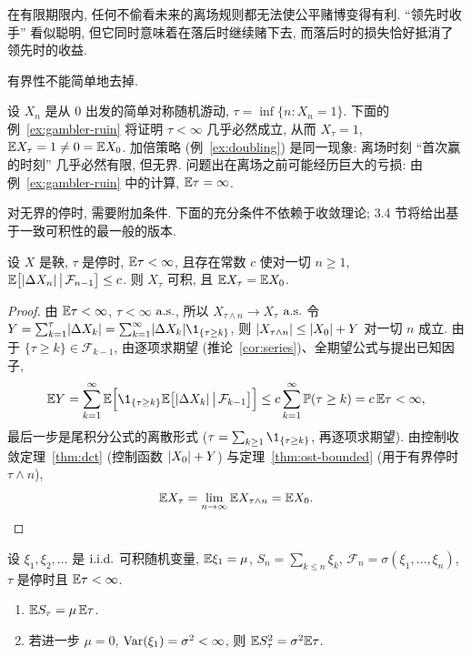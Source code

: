 \begin{intuition}
在有限期限内, 任何不偷看未来的离场规则都无法使公平赌博变得有利. ``领先时收手'' 看似聪明, 但它同时意味着在落后时继续赌下去, 而落后时的损失恰好抵消了领先时的收益.
\end{intuition}

有界性不能简单地去掉.

\begin{example}\label{ex:ost-fails}
设 $X_n$ 是从 $0$ 出发的简单对称随机游动, $\tau=\inf\{n: X_n=1\}$. 下面的例~\ref{ex:gambler-ruin} 将证明 $\tau<\infty$ 几乎必然成立, 从而 $X_\tau=1$, $\mathbb{E} X_\tau=1\ne0=\mathbb{E} X_0$. 加倍策略 (例~\ref{ex:doubling}) 是同一现象: 离场时刻 ``首次赢的时刻'' 几乎必然有限, 但无界. 问题出在离场之前可能经历巨大的亏损: 由例~\ref{ex:gambler-ruin} 中的计算, $\mathbb{E}\tau=\infty$.
\end{example}

对无界的停时, 需要附加条件. 下面的充分条件不依赖于收敛理论; 3.4 节将给出基于一致可积性的最一般的版本.

\begin{theorem}\label{thm:ost-bounded-increments}
设 $X$ 是鞅, $\tau$ 是停时, $\mathbb{E}\tau<\infty$, 且存在常数 $c$ 使对一切 $n\ge1$,
$\mathbb{E}\big[\lvert\Delta X_n\rvert\,\big|\,\mathcal{F}_{n-1}\big]\le c$. 则 $X_\tau$ 可积, 且 $\mathbb{E} X_\tau=\mathbb{E} X_0$.
\end{theorem}

\begin{proof}
由 $\mathbb{E}\tau<\infty$, $\tau<\infty$ $\text{a.s.}$, 所以 $X_{\tau\wedge n}\to X_\tau$ $\text{a.s.}$ 令 $Y=\sum_{k=1}^\tau\abs{\Delta X_k}=\sum_{k=1}^\infty\abs{\Delta X_k}\1_{\{\tau\ge k\}}$, 则 $\lvert X_{\tau\wedge n}\rvert\le\lvert X_0\rvert+Y$ 对一切 $n$ 成立. 由于 $\{\tau\ge k\}\in\mathcal{F}_{k-1}$, 由逐项求期望 (推论~\ref{cor:series})、全期望公式与提出已知因子,
\[
\E Y=\sum_{k=1}^\infty\E\Big[\1_{\{\tau\ge k\}}\E\big[\abs{\Delta X_k}\,\big|\,\mathcal{F}_{k-1}\big]\Big]\le c\sum_{k=1}^\infty\P(\tau\ge k)=c\,\E\tau<\infty,
\]
最后一步是尾积分公式的离散形式 ($\tau=\sum_{k\ge1}\1_{\{\tau\ge k\}}$, 再逐项求期望). 由控制收敛定理~\ref{thm:dct} (控制函数 $\lvert X_0\rvert+Y$) 与定理~\ref{thm:ost-bounded} (用于有界停时 $\tau\wedge n$),
\[
\mathbb{E} X_\tau=\lim_{n\to\infty}\mathbb{E} X_{\tau\wedge n}=\mathbb{E} X_0.\qedhere
\]
\end{proof}

\begin{corollary}\label{cor:wald}
设 $\xi_1,\xi_2,\dots$ 是 $\text{i.i.d.}$ 可积随机变量, $\mathbb{E}\xi_1=\mu$, $S_n=\sum_{k\le n}\xi_k$, $\mathcal{F}_n=\sigma(\xi_1,\dots,\xi_n)$, $\tau$ 是停时且 $\mathbb{E}\tau<\infty$.
\begin{enumerate}
\item $\mathbb{E} S_\tau=\mu\,\mathbb{E}\tau$.
\item 若进一步 $\mu=0$, $\operatorname{Var}(\xi_1)=\sigma^2<\infty$, 则 $\mathbb{E} S_\tau^2=\sigma^2\mathbb{E}\tau$.
\end{enumerate}
\end{corollary}

